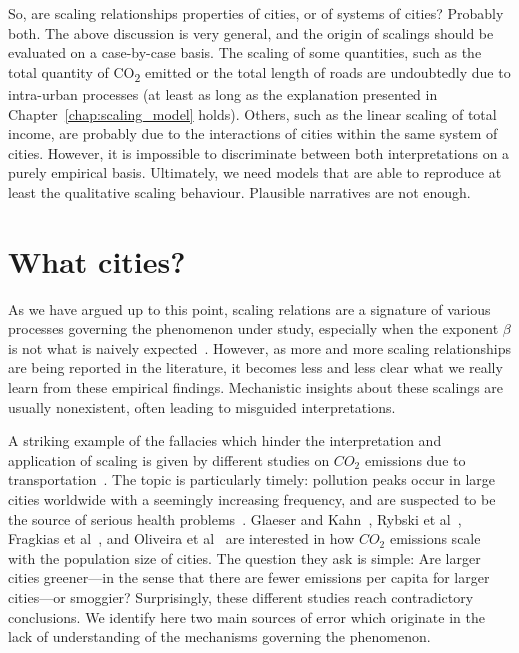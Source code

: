 So, are scaling relationships properties of cities, or of systems of cities?
Probably both. The above discussion is very general, and the origin of scalings
should be evaluated on a case-by-case basis. The scaling of some quantities,
such as the total quantity of CO\textsubscript{2} emitted or the total length of
roads are undoubtedly due to intra-urban processes (at least as long as the
explanation presented in Chapter~\ref{chap:scaling_model} holds). Others, such as the linear
scaling of total income, are probably due to the interactions of cities within
the same system of cities. However, it is impossible to discriminate between
both interpretations on a purely empirical basis. Ultimately, we need models that are
able to reproduce at least the qualitative scaling behaviour. Plausible
narratives are not enough.


\section{What cities?}
\label{sec:what_cities_}

As we have argued up to this point, scaling relations are a signature
of various processes governing the phenomenon under study, especially when the exponent
$\beta$ is not what is naively expected~\cite{Barenblatt:1996}. However, as more and more scaling
relationships are being reported in the literature, it becomes less and less clear what we really
learn from these empirical findings. Mechanistic insights about these scalings are usually
nonexistent, often leading to misguided interpretations.


A striking example of the fallacies which hinder the interpretation and
application of scaling is given by different studies on $CO_2$ emissions due to
transportation~\cite{Fragkias:2013,Glaeser:2010,Oliveira:2014,Rybski:2013}. The
topic is particularly timely: pollution peaks occur in large cities worldwide
with a seemingly increasing frequency, and are suspected to be the source of
serious health problems~\cite{Bernstein:2004}. Glaeser and
Kahn~\cite{Glaeser:2010}, Rybski et al~\cite{Rybski:2013}, Fragkias et
al~\cite{Fragkias:2013}, and Oliveira et al~\cite{Oliveira:2014} are interested
in how $CO_2$ emissions scale with the population size of cities. The question
they ask is simple: Are larger cities greener---in the sense that there are
fewer emissions per capita for larger cities---or smoggier? Surprisingly, these
different studies reach contradictory conclusions. We identify here two main
sources of error which originate in the lack of understanding of the mechanisms
governing the phenomenon.

